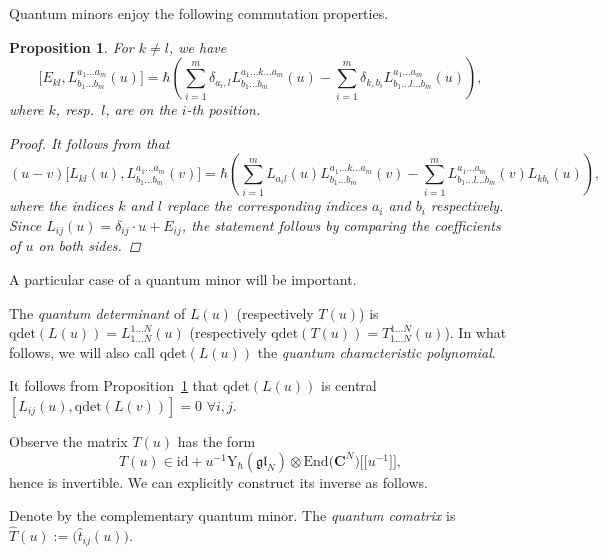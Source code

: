 \documentclass[10pt,a4paper]{article}
\numberwithin{equation}{section}
\newtheorem{Proposition}[Theorem]{Proposition}
{ \theoremstyle{definition}
	\newtheorem{Definition}[Theorem]{Definition}
	\newtheorem{Note}[Theorem]{Note}
	\newtheorem{Example}[Theorem]{Example}
	\newtheorem{Remark}[Theorem]{Remark} }
\newcommand{\C}{\mathbf{C}}
\newcommand{\rY}{\mathrm{Y}_{\hbar}}
\newcommand{\End}{\mathrm{End}}
\newcommand{\id}{\mathrm{id}}
\newcommand{\qdet}{\mathrm{qdet}}
\newcommand{\gl}{\mathfrak{gl}}
\begin{document}
	Quantum minors enjoy the following commutation properties.
	\begin{Proposition}
		\label{prop::minor_comm}
		For $k\neq l$, we have
		\begin{equation*}
			\bigl[E_{kl}, L_{b_1\dots b_m}^{a_1 \dots a_m}(u)\bigr] = \hbar \left(\sum\limits_{i=1}^m \delta_{a_i,l} L_{b_1\dots b_m}^{a_1\dots k \dots a_m}(u) - \sum\limits_{i=1}^m \delta_{k,b_i} L_{b_1\dots l \dots b_m}^{a_1\dots a_m}(u)\right),
		\end{equation*}
		where $k$, resp.\ $l$, are on the $i$-th position.
		\begin{proof}
			It follows from \cite[Proposition 1.7.1]{MolevYangians} that
			\begin{equation*}
				(u-v) \bigl[L_{kl}(u), L_{b_1 \dots b_m}^{a_1 \dots a_m}(v)\bigr] =\hbar \left( \sum\limits_{i=1}^m L_{a_i l}(u) L_{b_1 \dots b_m}^{a_1 \dots k \dots a_m}(v) - \sum\limits_{i=1}^{m} L_{b_1 \dots l \dots b_m}^{a_1 \dots a_m}(v) L_{k b_i}(u) \right),
			\end{equation*}
			where the indices $k$ and $l$ replace the corresponding indices $a_i$ and $b_i$ respectively. Since $L_{ij}(u) = \delta_{ij} \cdot u + E_{ij}$, the statement follows by comparing the coefficients of $u$ on both sides.
		\end{proof}
	\end{Proposition}
	
	A particular case of a quantum minor will be important.
	
	\begin{Definition}
		\label{def::qdet}
		The \emph{quantum determinant} of $L(u)$ (respectively $T(u)$) is
$
		\qdet(L(u)) = L_{1\dots N}^{1\dots N}(u)
$
		\big(respectively $\qdet(T(u)) = T_{1\dots N}^{1\dots N}(u)$\big). In what follows, we will also call $\qdet(L(u))$ the \emph{quantum characteristic polynomial}.
	\end{Definition}
	
	It follows from Proposition~\ref{prop::minor_comm} that $\qdet(L(u))$ is central
$
	[L_{ij}(u), \qdet(L(v))] = 0$  $\forall i,j$.
	
	Observe the matrix $T(u)$ has the form
	\[
	T(u) \in \id + u^{-1} \rY(\gl_N) \otimes \End\bigl(\C^N\bigr)\bigl[\bigl[u^{-1}\bigr]\bigr],
	\]
	hence is invertible. We can explicitly construct its inverse as follows.
	\begin{Definition}
		Denote by  the complementary quantum minor. The \emph{quantum comatrix} is $
		\hat{T}(u) := \bigl(\hat{t}_{ij}(u)\bigr)$.
	\end{Definition}
	
\end{document}
